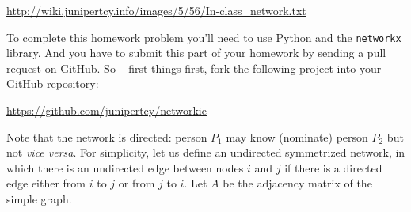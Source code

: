 \documentclass[10pt]{article}
\begin{document}
\begin{enumerate}
{	\begin{center}
		\url{http://wiki.junipertcy.info/images/5/56/In-class_network.txt}
	\end{center}
	
	To complete this homework problem you'll need to use Python and the \texttt{networkx} library. And you have to submit this part of your homework by sending a pull request on GitHub. So -- first things first, fork the following project into your GitHub repository:
	
	\begin{center}
		\url{https://github.com/junipertcy/networkie}
	\end{center}
	
	Note that the network is directed: person $P_1$ may know (nominate) person $P_2$ but not {\it vice versa}. For simplicity, let us define an undirected symmetrized network, in which there is an undirected edge between nodes $i$ and $j$ if there is a directed edge either from $i$ to $j$ or from $j$ to $i$. Let $A$ be the adjacency matrix of the simple graph.
	
}
\end{enumerate}
\end{document}

